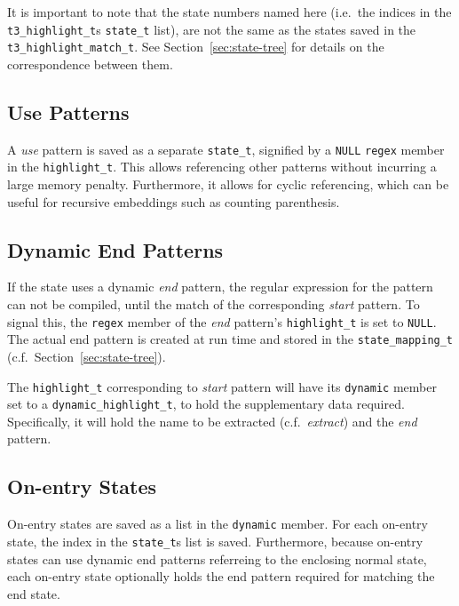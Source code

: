 \documentclass[a4paper]{article}
\newcommand{\state}{{\tt state_t}\xspace}
\newcommand{\highlight}{{\tt highlight_t}\xspace}
\begin{document}
\begin{multicols}{2}
It is important to note that the state numbers named here (i.e.\ the indices in
the {\tt t3_highlight_t}s \state list), are not the same as the states saved in
the {\tt t3_highlight_match_t}. See Section~\ref{sec:state-tree} for details on
the correspondence between them.


\subsection{Use Patterns}
A {\it use} pattern is saved as a separate \state, signified by a {\tt NULL}
{\tt regex} member in the \highlight\footnotemark[1]. This allows referencing
other patterns without incurring a large memory penalty. Furthermore, it allows
for cyclic referencing, which can be useful for recursive embeddings such as
counting parenthesis.

\subsection{Dynamic End Patterns}
If the state uses a dynamic {\it end} pattern, the regular expression for the
pattern can not be compiled, until the match of the corresponding {\it start}
pattern. To signal this, the {\tt regex} member of the {\it end} pattern's \highlight is set
to {\tt NULL}\footnotemark[1]. The actual end pattern is created at run time
and stored in the {\tt state_mapping_t} (c.f.\ Section~\ref{sec:state-tree}).


The \highlight corresponding to {\it start} pattern will have its {\tt dynamic}
member set to a {\tt dynamic_highlight_t}, to hold the supplementary data
required\footnotemark[2]. Specifically, it will hold the name to be extracted
(c.f.\ {\it extract}) and the {\it end} pattern.

\subsection{On-entry States}
On-entry states are saved as a list in the {\tt dynamic} member\footnotemark[2].
For each on-entry state, the index in the \state{}s list is saved. Furthermore,
because on-entry states can use dynamic end patterns referreing to the
enclosing normal state, each on-entry state optionally holds the end pattern
required for matching the end state.


\end{multicols}
\end{document}

